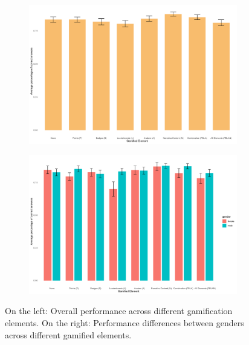 \begin{figure}[h]
    \centering
    \begin{subfigure}[b]{0.45\textwidth}
        \includegraphics[width=\textwidth]{img/plots/plot_performance.png}
        \label{fig:plot_performance}
    \end{subfigure}
    \hfill
    \begin{subfigure}[b]{0.45\textwidth}
        \includegraphics[width=\textwidth]{img/plots/plot_performance_gender.png}
        \label{fig:plot_performance_gender}
    \end{subfigure}
    \caption{On the left: Overall performance across different gamification elements. On the right: Performance differences between genders across different gamified elements.}
    \label{fig:performance_comparison}
\end{figure}

